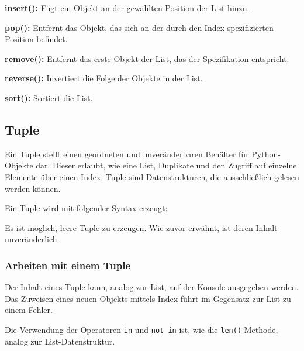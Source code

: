 \textbf{insert():}
Fügt ein Objekt an der gewählten Position der List hinzu.

\label{collections:lst:listinsert}

\textbf{pop():}
Entfernt das Objekt, das sich an der durch den Index spezifizierten Position befindet.

\label{collections:lst:listpop}
    
\textbf{remove():}
Entfernt das erste Objekt der List, das der Spezifikation entspricht.

\label{collections:lst:listremove}
    
\textbf{reverse():}
Invertiert die Folge der Objekte in der List.

\label{collections:lst:listreverse}

\textbf{sort():}
Sortiert die List.

\label{collections:lst:listsort}

    
\subsection{Tuple}
\label{collections:tuple}

Ein Tuple stellt einen geordneten und unveränderbaren Behälter für Python-Objekte dar. Dieser erlaubt, wie eine List, Duplikate und den Zugriff auf einzelne Elemente über einen Index. Tuple sind Datenstrukturen, die ausschließlich gelesen werden können.

Ein Tuple wird mit folgender Syntax erzeugt:

\label{collections:lst:tupleinit}

Es ist möglich, leere Tuple zu erzeugen. Wie zuvor erwähnt, ist deren Inhalt unveränderlich.

\subsubsection{Arbeiten mit einem Tuple}
\label{collections:workwithtuple} 

Der Inhalt eines Tuple kann, analog zur List, auf der Konsole ausgegeben werden. Das Zuweisen eines neuen Objekts mittels Index führt im Gegensatz zur List zu einem Fehler.

\label{collections:lst:tupleindex}    
    
Die Verwendung der Operatoren \lstinline$in$ und \lstinline$not in$ ist, wie die \lstinline$len()$-Methode, analog zur List-Datenstruktur.

\label{collections:lst:tupleinlen} 
    
